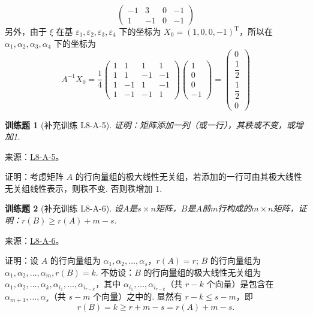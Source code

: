 \documentclass[UTF8,12pt,a4paper,fontset=fandol]{ctexart}
\newtheorem{exercise}{训练题}[section]
\begin{document}
\begin{solve}
\[\begin{pmatrix}
                    -1 & 3  & 0 & -1 \\
                    1  & -1 & 0 & -1
                \end{pmatrix} \]
            另外，由于 $ \xi $ 在基 $ \varepsilon_1, \varepsilon_2, \varepsilon_3, \varepsilon_4 $ 下的坐标为 $ X_0 = (1, 0, 0, -1)^{\mathrm{T}} $，所以在 $ \alpha_1, \alpha_2, \alpha_3, \alpha_4 $ 下的坐标为
            \[ A^{-1} X_0 = \dfrac{1}{4} \begin{pmatrix}
                    1 & 1  & 1  & 1  \\
                    1 & 1  & -1 & -1 \\
                    1 & -1 & 1  & -1 \\
                    1 & -1 & -1 & 1
                \end{pmatrix} \begin{pmatrix}
                    1 \\ 0 \\ 0 \\ -1
                \end{pmatrix} = \begin{pmatrix}
                    0 \\ \dfrac{1}{2} \\ \dfrac{1}{2} \\ 0
                \end{pmatrix} \]
\end{solve}

\begin{exercise}[补充训练 L8-A-5]\label{prob:L8-A-5}
证明：矩阵添加一列（或一行），其秩或不变，或增加1.
\end{exercise}
\noindent 来源：\href{https://github.com/yhwu-is/Linear-Algebra-Left-Undone/blob/new/%E8%AE%B2%E4%B9%89/%E4%B8%93%E9%A2%98/8%20%E7%9B%B8%E6%8A%B5%E6%A0%87%E5%87%86%E5%BD%A2.tex}{L8-A-5}。
\begin{solve}
证明：考虑矩阵 $A$ 的行向量组的极大线性无关组，若添加的一行可由其极大线性无关组线性表示，则秩不变. 否则秩增加 $1$.
\end{solve}

\begin{exercise}[补充训练 L8-A-6]\label{prob:L8-A-6}
设$A$是$s \times n$矩阵，$B$是$A$前$m$行构成的$m \times n$矩阵，证明：$r(B) \geqslant r(A) + m - s$.
\end{exercise}
\noindent 来源：\href{https://github.com/yhwu-is/Linear-Algebra-Left-Undone/blob/new/%E8%AE%B2%E4%B9%89/%E4%B8%93%E9%A2%98/8%20%E7%9B%B8%E6%8A%B5%E6%A0%87%E5%87%86%E5%BD%A2.tex}{L8-A-6}。
\begin{solve}
证明：设 $A$ 的行向量组为 $\alpha_1,\alpha_2,\ldots,\alpha_s$，$r(A)=r$; $B$ 的行向量组为 $\alpha_1,\alpha_2,\ldots,\alpha_m ,r(B)=k$.
            不妨设：$B$ 的行向量组的极大线性无关组为 $\alpha_1,\alpha_2,\ldots,\alpha_k,\alpha_{i_1},\ldots,\alpha_{i_{r-k}}$，其中 $\alpha_{i_1},\ldots,\alpha_{i_{r-k}}$（共 $r-k$ 个向量）是包含在 $\alpha_{m+1},\ldots,\alpha_s$（共 $s-m$ 个向量）之中的. 显然有 $r-k \leqslant s-m $，即
            \[r(B)=k\geqslant r+m-s=r(A)+m-s.\]
\end{solve}
\end{document}
